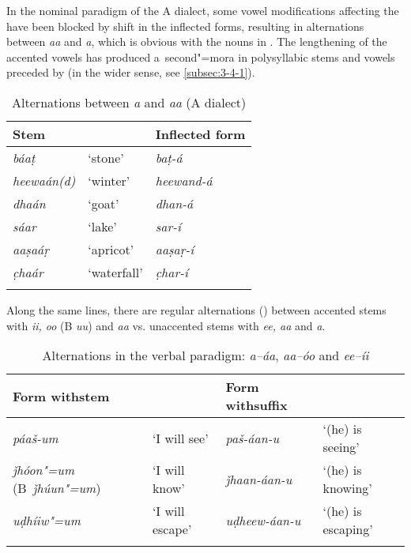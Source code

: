 In the nominal paradigm of the A dialect, some vowel modifications affecting the  have been blocked by  shift in the inflected forms, resulting in alternations between \textit{aa} and \textit{a}, which is obvious with the nouns in . The lengthening of the accented vowels has produced a~second"=mora  in polysyllabic stems and vowels preceded by  (in the wider sense, see \ref{subsec:3-4-1}). 

\begin{table}[p]
\caption{Alternations between \textit{a} and \textit{aa} (A dialect)}
\begin{tabularx}{\textwidth}{ Q Q Q }
\lsptoprule
Stem &
&
Inflected form\\\midrule
\textit{báaṭ} &
`stone' &
\textit{baṭ-á} \\
\textit{heewaán(d)} &
`winter' &
\textit{heewand-á} \\
\textit{dhaán} &
`goat' &
\textit{dhan-á}\\
\textit{sáar} &
`lake' &
\textit{sar-í}\\
\textit{aaṣaáṛ} &
`apricot' &
\textit{aaṣaṛ-í} \\
\textit{c̣haár} &
`waterfall' &
\textit{c̣har-í} \\\lspbottomrule
\end{tabularx}
\label{tab:3-13}
\end{table}


Along the same lines, there are regular alternations () between accented stems with \textit{ii, oo} (B \textit{uu}) and \textit{aa} vs. unaccented stems with \textit{ee, aa} and \textit{a}.



\begin{table}[p]
\caption{Alternations in the verbal paradigm: \textit{a--áa}, \textit{aa--óo} and \textit{ee--íi}}
\begin{tabularx}{\textwidth}{ Q l Q l }
\lsptoprule
Form with\newline stem  &
&
Form with\newline suffix  &
\\\midrule
\textit{páaš-um} &
`I will see' &
\textit{paš-áan-u} &
`(he) is seeing'\\
\textit{ǰhóon"=um} (B~\textit{ǰhúun"=um}) &
`I will know' &
\textit{ǰhaan-áan-u} &
`(he) is knowing'\\
\textit{uḍhíiw"=um} &
`I will escape' &
\textit{uḍheew-áan-u} &
`(he) is escaping'\\\lspbottomrule
\end{tabularx}
\label{tab:3-14}
\end{table}

